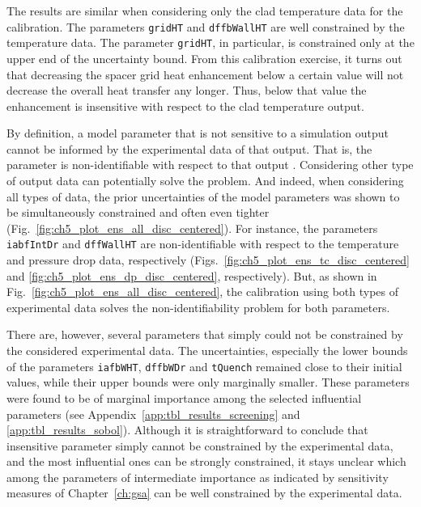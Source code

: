The results are similar when considering only the clad temperature data for the calibration.
The parameters \texttt{gridHT} and \texttt{dffbWallHT} are well constrained by the temperature data.
The parameter \texttt{gridHT}, in particular, is constrained only at the upper end of the uncertainty bound.
From this calibration exercise, it turns out that decreasing the spacer grid heat enhancement below a certain value will not decrease the overall heat transfer any longer.
Thus, below that value the enhancement is insensitive with respect to the clad temperature output.

By definition, a model parameter that is not sensitive to a simulation output cannot be informed by the experimental data of that output. 
That is, the parameter is non-identifiable with respect to that output \cite{Hines2014}.
Considering other type of output data can potentially solve the problem.
And indeed, when considering all types of data, the prior uncertainties of the model parameters was shown to be simultaneously constrained and often even tighter (Fig.~\ref{fig:ch5_plot_ens_all_disc_centered}).
For instance, the parameters \texttt{iabfIntDr} and \texttt{dffWallHT} are non-identifiable with respect to the temperature and pressure drop data, respectively (Figs.~\ref{fig:ch5_plot_ens_tc_disc_centered} and \ref{fig:ch5_plot_ens_dp_disc_centered}, respectively).
But, as shown in Fig.~\ref{fig:ch5_plot_ens_all_disc_centered}, the calibration using both types of experimental data solves the non-identifiability problem for both parameters.

There are, however, several parameters that simply could not be constrained by the considered experimental data.
The uncertainties, especially the lower bounds of the parameters \texttt{iafbWHT}, \texttt{dffbWDr} and \texttt{tQuench} remained close to their initial values,
while their upper bounds were only marginally smaller. 
These parameters were found to be of marginal importance among the selected influential parameters (see Appendix~\ref{app:tbl_results_screening} and \ref{app:tbl_results_sobol}).
Although it is straightforward to conclude that insensitive parameter simply cannot be constrained by the experimental data, and the most influential ones can be strongly constrained, it stays unclear which among the parameters of intermediate importance as indicated by sensitivity measures of Chapter~\ref{ch:gsa} can be well constrained by the experimental data.

